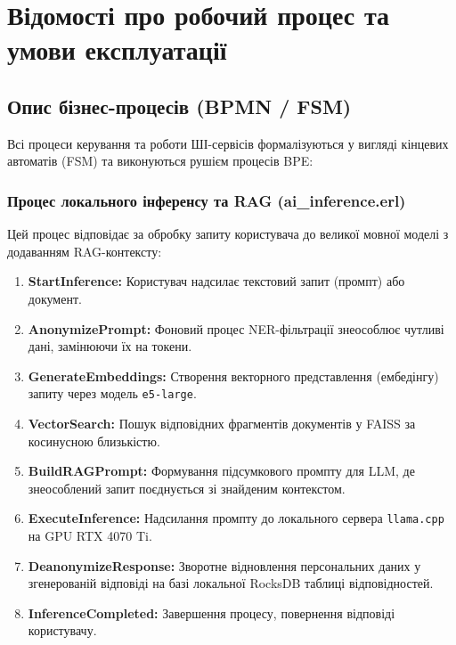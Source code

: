 \documentclass{article}
\begin{document}
\newpage
\section{Відомості про робочий процес та умови експлуатації}

\subsection{Опис бізнес-процесів (BPMN / FSM)}
Всі процеси керування та роботи ШІ-сервісів формалізуються у вигляді кінцевих автоматів (FSM) та виконуються рушієм процесів BPE:

\subsubsection{Процес локального інференсу та RAG (ai\_inference.erl)}
Цей процес відповідає за обробку запиту користувача до великої мовної моделі з додаванням RAG-контексту:
\begin{enumerate}
    \item \textbf{StartInference:} Користувач надсилає текстовий запит (промпт) або документ.
    \item \textbf{AnonymizePrompt:} Фоновий процес NER-фільтрації знеособлює чутливі дані, замінюючи їх на токени.
    \item \textbf{GenerateEmbeddings:} Створення векторного представлення (ембедінгу) запиту через модель \texttt{e5-large}.
    \item \textbf{VectorSearch:} Пошук відповідних фрагментів документів у FAISS за косинусною близькістю.
    \item \textbf{BuildRAGPrompt:} Формування підсумкового промпту для LLM, де знеособлений запит поєднується зі знайденим контекстом.
    \item \textbf{ExecuteInference:} Надсилання промпту до локального сервера \texttt{llama.cpp} на GPU RTX 4070 Ti.
    \item \textbf{DeanonymizeResponse:} Зворотне відновлення персональних даних у згенерованій відповіді на базі локальної RocksDB таблиці відповідностей.
    \item \textbf{InferenceCompleted:} Завершення процесу, повернення відповіді користувачу.
\end{enumerate}
\end{document}
